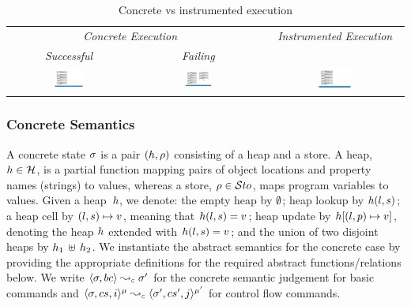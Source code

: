\begin{table}[t!]
\centering
\renewcommand{\arraystretch}{1.2} 
{\scriptsize \begin{tabular}{@{}ccccc@{}}\toprule
\multicolumn{3}{c}{{\it Concrete Execution}} & &  \emph{Instrumented Execution}  \\
\cmidrule{1-3} \cmidrule{5-5}
\emph{Successful}  &  & \emph{Failing}  &   &       \\
\cmidrule{1-1} \cmidrule{3-3}   
{\includegraphics[width=0.25\textwidth]{figures/conc_exec.pdf}} & & 
{\includegraphics[width=0.25\textwidth]{figures/conc_wrong_exec.pdf}}  & & 
{\includegraphics[width=0.25\textwidth]{figures/inst_exec.pdf}}  \\  
\bottomrule
\end{tabular}}
\vspace{2pt}
\caption{Concrete vs instrumented execution\label{example:symb:states:vs:assertions}}
\vspace*{-0.5cm}
\end{table}

\vspace{-5pt}
\subsubsection{Concrete Semantics}
A \jsil concrete state $\sigma$ is a pair $(h, \rho)$ consisting of a heap and a store. 
A heap, $h \in {\mathcal H}$, is a partial function mapping pairs of  object locations and property names (strings) to values,
whereas a store, $\rho \in \mathcal{S}to$, maps program variables to values. 
Given a heap~$h$, we denote: the empty heap by $\emptyset$; heap lookup by $h(l, s)$; 
a heap cell by $(l, s) \mapsto v$, meaning that  $h(l,s) = v$; 
heap update by $h[(l, p) \mapsto v]$, denoting the heap $h$ extended with $h(l,s) = v$;
and the union of two disjoint heaps by $h_1 \, \uplus \, h_2$.
We instantiate the abstract semantics for the concrete case by providing the appropriate definitions 
for the required abstract functions/relations below.
We write $\absbsemrule{\jstate, \bcmd}{\jstate'}{\concrete}$ for the concrete semantic 
judgement for basic commands and $\abssemrule{\jstate, \cs, i}{\jstate', \cs', j}{\mode}{\mode'}{\concrete}$ 
for control flow commands. 

